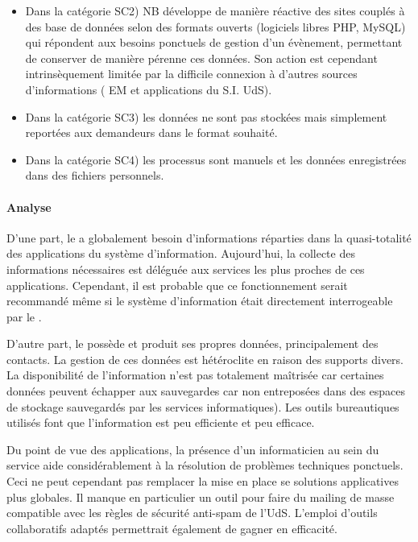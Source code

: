 \documentclass{book}
\begin{document}
\begin{itemize}
\item Dans la catégorie SC2) NB développe de manière réactive des sites couplés à 
	des base de données selon des formats ouverts (logiciels libres PHP, MySQL) 
	qui répondent aux besoins ponctuels de gestion d'un évènement, permettant
	de conserver de manière pérenne ces données. Son action est cependant intrinsèquement
	limitée par la difficile connexion à d'autres sources d'informations ( 
	EM et applications du S.I. UdS).

\item Dans la catégorie SC3) les données ne sont pas stockées mais simplement reportées
	aux demandeurs dans le format souhaité.

\item Dans la catégorie SC4) les processus sont manuels et les données enregistrées
	dans des fichiers personnels.
\end{itemize}

\paragraph{Analyse}

D'une part, le \scom a globalement besoin d'informations réparties dans la 
quasi-totalité des applications du système d'information. Aujourd'hui, la 
collecte des informations nécessaires est déléguée aux services les plus 
proches de ces applications. Cependant, il est probable que ce fonctionnement 
serait recommandé même si le système d'information était directement interrogeable 
par le \scom.

D'autre part, le \scom possède et produit ses propres données, principalement 
des contacts. La gestion de ces données est hétéroclite en raison des supports 
divers. La disponibilité de l'information n'est pas totalement maîtrisée car 
certaines données peuvent échapper aux sauvegardes car non entreposées dans des 
espaces de stockage sauvegardés par les services informatiques). Les outils 
bureautiques utilisés font que l'information est peu efficiente et peu efficace. 


Du point de vue des applications, la présence d'un informaticien au sein du service 
aide considérablement à la résolution de problèmes techniques ponctuels. Ceci ne 
peut cependant pas remplacer la mise en place se solutions applicatives plus globales. 
Il manque en particulier un outil pour faire du mailing de masse compatible avec les 
règles de sécurité anti-spam de l'UdS. L'emploi d'outils collaboratifs adaptés 
permettrait également de gagner en efficacité. 
\end{document}
